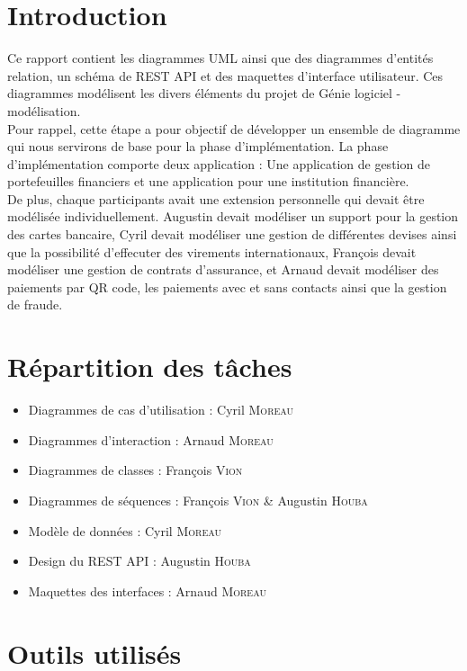 \section{Introduction}

Ce rapport contient les diagrammes UML ainsi que des diagrammes d'entités relation, un schéma de REST API et des maquettes d'interface utilisateur.
Ces diagrammes modélisent les divers éléments du projet de Génie logiciel - modélisation.\\
Pour rappel, cette étape a pour objectif de développer un ensemble de diagramme qui nous servirons de base pour la phase d'implémentation.
La phase d'implémentation comporte deux application : Une application de gestion de portefeuilles financiers et une application pour une institution financière.\\
De plus, chaque participants avait une extension personnelle qui devait être modélisée individuellement.
Augustin devait modéliser un support pour la gestion des cartes bancaire, 
Cyril devait modéliser une gestion de différentes devises ainsi que la possibilité d'effecuter des virements internationaux,
François devait modéliser une gestion de contrats d'assurance,
et Arnaud devait modéliser des paiements par QR code, les paiements avec et sans contacts ainsi que la gestion de fraude.

\section{Répartition des tâches}
\begin{itemize}
    \item Diagrammes de cas d'utilisation : Cyril \textsc{Moreau}
    \item Diagrammes d'interaction : Arnaud \textsc{Moreau}
    \item Diagrammes de classes : François \textsc{Vion}
    \item Diagrammes de séquences : François \textsc{Vion} \& Augustin \textsc{Houba}
    \item Modèle de données : Cyril \textsc{Moreau}
    \item Design du REST API : Augustin \textsc{Houba}
    \item Maquettes des interfaces : Arnaud \textsc{Moreau}
\end{itemize}

\newpage

\section{Outils utilisés}

